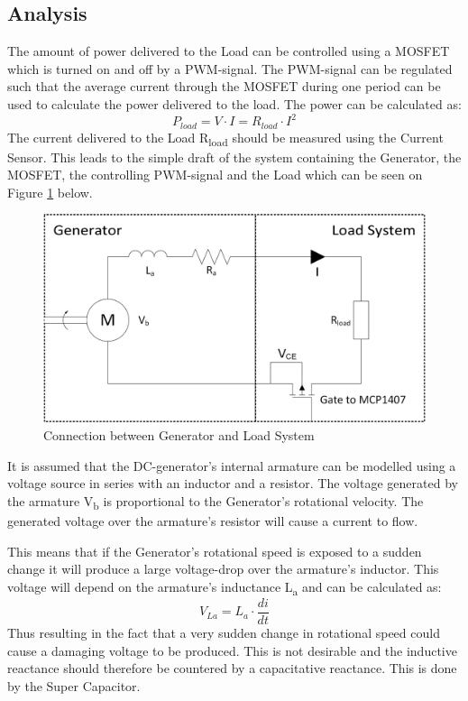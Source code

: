\subsection{Analysis}
The amount of power delivered to the Load can be controlled using a MOSFET which is turned on and off by a PWM-signal. The PWM-signal can be regulated such that the average current through the MOSFET during one period can be used to calculate the power delivered to the load. The power can be calculated as:
\begin{equation}
	P_{load} = V \cdot I = R_{load} \cdot I^2
\end{equation}
The current delivered to the Load R\textsubscript{load} should be measured using the Current Sensor. This leads to the simple draft of the system containing the Generator, the MOSFET, the controlling PWM-signal and the Load which can be seen on Figure \ref{fig:Load_System} below.

\begin{figure}[H]
	\centering
	\includegraphics[width=0.7\linewidth]{Hardware/Pictures/LoadSystem}
	\caption{Connection between Generator and Load System}
	\label{fig:Load_System}
\end{figure}

It is assumed that the DC-generator's internal armature can be modelled using a voltage source in series with an inductor and a resistor. The voltage generated by the armature V\textsubscript{b} is proportional to the Generator's rotational velocity. The generated voltage over the armature's resistor will cause a current to flow.

This means that if the Generator's rotational speed is exposed to a  sudden change it will produce a large voltage-drop over the armature's inductor. This voltage will depend on the armature's inductance L\textsubscript{a} and can be calculated as:
\begin{equation}
	V_{La} = L_a \cdot \frac{di}{dt}
\end{equation}
Thus resulting in the fact that a very sudden change in rotational speed could cause a damaging voltage to be produced. This is not desirable and the inductive reactance should therefore be countered by a capacitative reactance. This is done by the Super Capacitor.